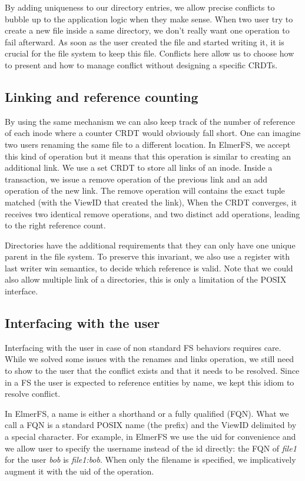 \documentclass[sigplan, 10pt]{acmart}
\begin{document}
By adding uniqueness to our directory entries, we allow precise conflicts to bubble up to the application logic when they make sense.
When two user try to create a new file inside a same directory, we don't
really want one operation to fail afterward. As soon as the user created the
file and started writing it, it is crucial for the file system to keep this
file. Conflicts here allow us to choose how to present and how to manage
conflict without designing a specific CRDTs.

\subsection{Linking and reference counting}

By using the same mechanism we can also keep track of the number of reference
of each inode where a counter CRDT would obviously fall short. One can imagine two users
renaming the same file to a different location. In ElmerFS, we accept this kind
of operation but it means that this operation is similar to creating an additional link. We use a set CRDT to store all links of an inode. Inside a transaction,
we issue a remove operation of the previous link and an add operation of the new link. The remove operation will contains the exact tuple matched
(with the ViewID that created the link), When the CRDT converges, it receives
two identical remove operations, and two distinct add operations, leading to the right reference count.

Directories have the additional requirements that they can only have one unique
parent in the file system. To preserve this invariant, we also use a register
with last writer win semantics, to decide which reference is valid. Note that
we could also allow multiple link of a directories,
this is only a limitation of the POSIX interface.

\subsection{Interfacing with the user}

Interfacing with the user in case of non standard FS behaviors requires care.
While we solved some issues with the renames and links operation, we still
need to show to the user that the conflict exists and that it needs to be
resolved. Since in a FS the user is expected to reference entities by name,
we kept this idiom to resolve conflict.

In ElmerFS, a name is either a shorthand or a fully qualified (FQN).
What we call a FQN is a standard POSIX name (the prefix) and
the ViewID delimited by a special character.
For example, in ElmerFS we use the uid for convenience and
we allow user to specify the username instead of the id directly:
the FQN of \textit{file1} for the user
\textit{bob} is \textit{file1:bob}. When only the filename is specified, we
implicatively augment it with the uid of the operation.
\end{document}
